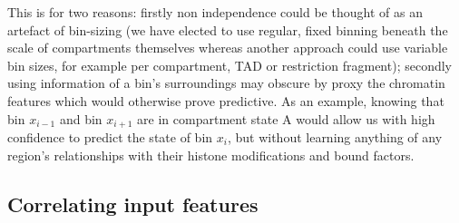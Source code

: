 \documentclass[a4paper,11pt,oneside]{book}
\begin{document}
This is for two reasons: firstly non independence could be thought of as an artefact of bin-sizing (we have elected to use regular, fixed binning beneath the scale of compartments themselves whereas another approach could use variable bin sizes, for example per compartment, TAD or restriction fragment); secondly using information of a bin's surroundings may obscure by proxy the chromatin features which would otherwise prove predictive. As an example, knowing that bin $x_{i-1}$ and bin $x_{i+1}$ are in compartment state A would allow us with high confidence to predict the state of bin $x_i$, but without learning anything of any region's relationships with their histone modifications and bound factors.

\subsection{Correlating input features}

\begin{small}

\end{small}
\end{document}
